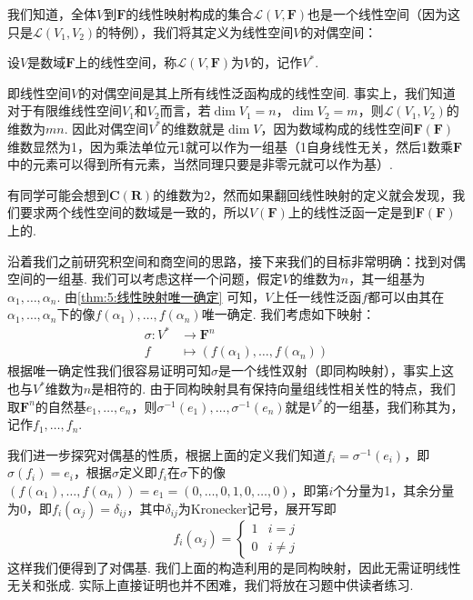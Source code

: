 我们知道，全体$V$到$\mathbf{F}$的线性映射构成的集合$\mathcal{L}(V,\mathbf{F})$也是一个线性空间（因为这只是$\mathcal{L}(V_1,V_2)$的特例），我们将其定义为线性空间$V$的对偶空间：
\begin{definition}[对偶空间] 
    设$V$是数域$\mathbf{F}$上的线性空间，称$\mathcal{L}(V,\mathbf{F})$为$V$的，记作$V^*$.
\end{definition}

即线性空间$V$的对偶空间是其上所有线性泛函构成的线性空间. 事实上，我们知道对于有限维线性空间$V_1$和$V_2$而言，若$\dim V_1=n$，$\dim V_2=m$，则$\mathcal{L}(V_1,V_2)$的维数为$mn$. 因此对偶空间$V^*$的维数就是$\dim V$，因为数域构成的线性空间$\mathbf{F}(\mathbf{F})$维数显然为1，因为乘法单位元1就可以作为一组基（1自身线性无关，然后1数乘$\mathbf{F}$中的元素可以得到所有元素，当然同理只要是非零元就可以作为基）.

有同学可能会想到$\mathbf{C}(\mathbf{R})$的维数为2，然而如果翻回线性映射的定义就会发现，我们要求两个线性空间的数域是一致的，所以$V(\mathbf{F})$上的线性泛函一定是到$\mathbf{F}(\mathbf{F})$上的.

沿着我们之前研究积空间和商空间的思路，接下来我们的目标非常明确：找到对偶空间的一组基. 我们可以考虑这样一个问题，假定$V$的维数为$n$，其一组基为$\alpha_1,\ldots,\alpha_n$. 由\autoref{thm:5:线性映射唯一确定} 可知，$V$上任一线性泛函$f$都可以由其在$\alpha_1,\ldots,\alpha_n$下的像$f(\alpha_1),\ldots,f(\alpha_n)$唯一确定. 我们考虑如下映射：
\begin{align*}
    \sigma:V^* & \to\mathbf{F}^n                         \\
    f          & \mapsto(f(\alpha_1),\ldots,f(\alpha_n))
\end{align*}
根据唯一确定性我们很容易证明可知$\sigma$是一个线性双射（即同构映射），事实上这也与$V^*$维数为$n$是相符的. 由于同构映射具有保持向量组线性相关性的特点，我们取$\mathbf{F}^n$的自然基$e_1,\ldots,e_n$，则$\sigma^{-1}(e_1),\ldots,\sigma^{-1}(e_n)$就是$V^*$的一组基，我们称其为，记作$f_1,\ldots,f_n$.

我们进一步探究对偶基的性质，根据上面的定义我们知道$f_i=\sigma^{-1}(e_i)$，即$\sigma(f_i)=e_i$，根据$\sigma$定义即$f_i$在$\sigma$下的像$(f(\alpha_1),\ldots,f(\alpha_n))=e_1=(0,\ldots,0,1,0,\ldots,0)$，即第$i$个分量为1，其余分量为0，即$f_i(\alpha_j)=\delta_{ij}$，其中$\delta_{ij}$为Kronecker记号，展开写即\[f_i(\alpha_j)=\begin{cases}
        1 & i=j     \\
        0 & i\neq j
    \end{cases}\]
这样我们便得到了对偶基. 我们上面的构造利用的是同构映射，因此无需证明线性无关和张成. 实际上直接证明也并不困难，我们将放在习题中供读者练习.

